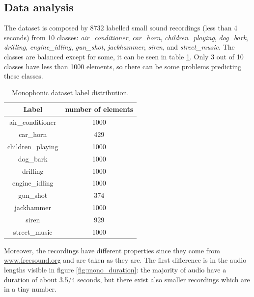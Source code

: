 \documentclass{article}
\begin{document}
\subsection{Data analysis}
\label{subsec:mono_analysis}

The dataset is composed by 8732 labelled small sound recordings (less than 4 seconds) from 10 classes: \textit{air\_conditioner}, \textit{car\_horn}, \textit{children\_playing}, \textit{dog\_bark}, \textit{drilling}, \textit{engine\_idling}, \textit{gun\_shot}, \textit{jackhammer}, \textit{siren}, and \textit{street\_music}. The classes are balanced except for some, it can be seen in table \ref{tab:mono_distribution}. Only 3 out of 10 classes have less than 1000 elements, so there can be some problems predicting these classes.

\begin{table}[H]
	\begin{center}
		\begin{tabular}{ |c | c | }
			\hline
			Label 				& number of elements \\ 
			\hline
			air\_conditioner 	& 1000 \\
			\hline
			car\_horn 			& 429 \\
			\hline
			children\_playing 	& 1000 \\
			\hline
			dog\_bark 			& 1000 \\
			\hline
			drilling 			& 1000 \\
			\hline
			engine\_idling 		& 1000 \\
			\hline
			gun\_shot 			& 374 \\
			\hline
			jackhammer 			& 1000 \\
			\hline
			siren 				& 929 \\
			\hline
			street\_music 		& 1000 \\
			\hline
		\end{tabular}
		\caption{Monophonic dataset label distribution.}
		\label{tab:mono_distribution}
	\end{center}
\end{table}

Moreover, the recordings have different properties since they come from \url{www.freesound.org} and are taken as they are. The first difference is in the audio lengths visible in figure \ref{fig:mono_duration}: the majority of audio have a duration of about 3.5/4 seconds, but there exist also smaller recordings which are in a tiny number.
\end{document}
